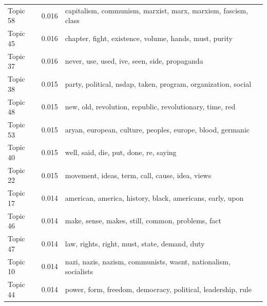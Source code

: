 \documentclass[12pt]{paper}
\begin{document}
\begin{table}[H]
\begin{adjustbox}{width=1\textwidth}
\begin{tabular}{lll}
			Topic 58                           & 0.016                                                  & capitalism, communism, marxist, marx, marxism, fascism, class       \\
			Topic 45                           & 0.016                                                  & chapter, fight, existence, volume, hands, must, purity              \\
			Topic 37                           & 0.016                                                  & never, use, used, ive, seen, side, propaganda                       \\
			Topic 38                           & 0.015                                                  & party, political, nsdap, taken, program, organization, social       \\
			Topic 48                           & 0.015                                                  & new, old, revolution, republic, revolutionary, time, red            \\
			Topic 53                           & 0.015                                                  & aryan, european, culture, peoples, europe, blood, germanic          \\
			Topic 40                           & 0.015                                                  & well, said, die, put, done, re, saying                              \\
			Topic 22                           & 0.015                                                  & movement, ideas, term, call, cause, idea, views                     \\
			Topic 17                           & 0.014                                                  & american, america, history, black, americans, early, upon           \\
			Topic 46                           & 0.014                                                  & make, sense, makes, still, common, problems, fact                   \\
			Topic 47                           & 0.014                                                  & law, rights, right, must, state, demand, duty                       \\
			Topic 10                           & 0.014                                                  & nazi, nazis, nazism, communists, wasnt, nationalism, socialists     \\
			Topic 44                           & 0.014                                                  & power, form, freedom, democracy, political, leadership, rule        \\

\end{tabular}
\end{adjustbox}
\end{table}
\end{document}
